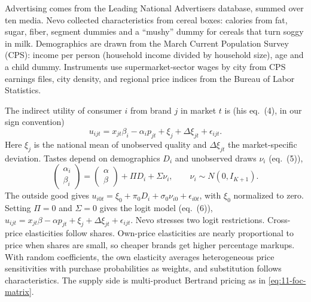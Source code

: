 Advertising comes from the Leading National Advertisers database, summed over ten media. Nevo collected
characteristics from cereal boxes: calories from fat, sugar, fiber, segment dummies and a ``mushy'' dummy for cereals
that turn soggy in milk. Demographics are drawn from the March Current Population Survey (CPS): income per person
(household income divided by household size), age and a child dummy. Instruments use supermarket-sector wages by city
from CPS earnings files, city density, and regional price indices from the Bureau of Labor Statistics.

 The indirect utility of consumer $i$ from brand $j$ in market $t$ is (his eq.~(4), in our sign
convention)
\begin{equation}\label{eq:11-nevo-u}
  u_{ijt} = x_{jt}\beta_i - \alpha_i p_{jt} + \xi_j + \Delta\xi_{jt} + \epsilon_{ijt} .
\end{equation}
Here $\xi_j$ is the national mean of unobserved quality and $\Delta\xi_{jt}$ the market-specific deviation. Tastes
depend on demographics $D_i$ and unobserved draws $\nu_i$ (eq.~(5)),
\begin{equation}\label{eq:11-nevo-rc}
  \begin{pmatrix} \alpha_i \\ \beta_i \end{pmatrix}
  = \begin{pmatrix} \alpha \\ \beta \end{pmatrix} + \Pi D_i + \Sigma \nu_i , \qquad \nu_i \sim N(0, I_{K+1}) .
\end{equation}
The outside good gives $u_{i0t} = \xi_0 + \pi_0 D_i + \sigma_0 \nu_{i0} + \epsilon_{i0t}$, with $\xi_0$ normalized to zero.
Setting $\Pi = 0$ and $\Sigma = 0$ gives the logit model (eq.~(6)), $u_{ijt} = x_{jt}\beta - \alpha p_{jt} + \xi_j +
\Delta\xi_{jt} + \epsilon_{ijt}$. Nevo stresses two logit restrictions. Cross-price elasticities follow shares. Own-price
elasticities are nearly proportional to price when shares are small, so cheaper brands get higher percentage markups.
With random coefficients, the own elasticity averages heterogeneous price sensitivities with purchase probabilities as
weights, and substitution follows characteristics. The supply side is multi-product Bertrand pricing as in
\eqref{eq:11-foc-matrix}.

